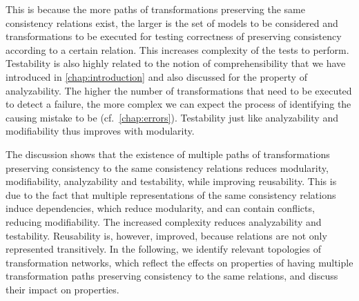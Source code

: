 \begin{properdescription}
    This is because the more paths of transformations preserving the same consistency relations exist, the larger is the set of models to be considered and transformations to be executed for testing correctness of preserving consistency according to a certain relation.
    This increases complexity of the tests to perform.
    Testability is also highly related to the notion of comprehensibility that we have introduced in \autoref{chap:introduction} and also discussed for the property of analyzability. 
    The higher the number of transformations that need to be executed to detect a failure, the more complex we can expect the process of identifying the causing mistake to be (cf.\ \autoref{chap:errors}).
    Testability just like analyzability and modifiability thus improves with modularity.
\end{properdescription}

The discussion shows that the existence of multiple paths of transformations preserving consistency to the same consistency relations reduces modularity, modifiability, analyzability and testability, while improving reusability.
This is due to the fact that multiple representations of the same consistency relations induce dependencies, which reduce modularity, and can contain conflicts, reducing modifiability.
The increased complexity reduces analyzability and testability.
Reusability is, however, improved, because relations are not only represented transitively.
In the following, we identify relevant topologies of transformation networks, which reflect the effects on properties of having multiple transformation paths preserving consistency to the same relations, and discuss their impact on properties.





